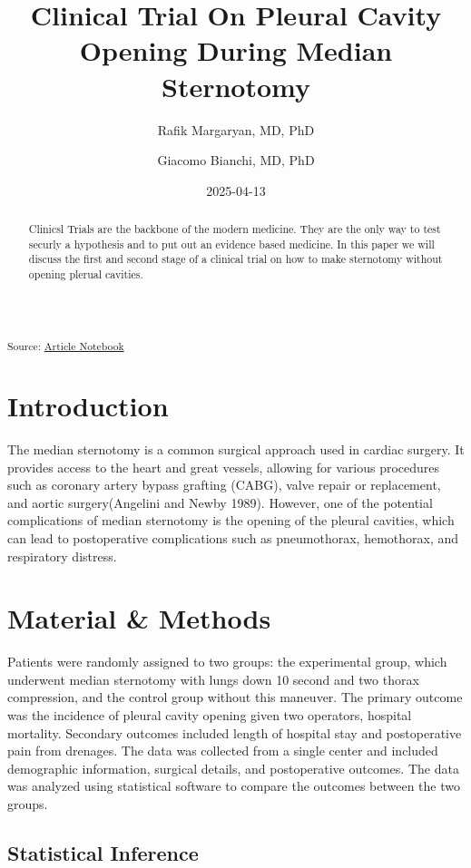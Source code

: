 \documentclass[
  letterpaper,
  DIV=11,
  numbers=noendperiod]{scrartcl}
\title{Clinical Trial On Pleural Cavity Opening During Median
Sternotomy}
\author{Rafik Margaryan, MD, PhD \and Giacomo Bianchi, MD, PhD}
\date{2025-04-13}
\begin{document}
\maketitle
\begin{abstract}
Clinicsl Trials are the backbone of the modern medicine. They are the
only way to test securly a hypothesis and to put out an evidence based
medicine. In this paper we will discuss the first and second stage of a
clinical trial on how to make sternotomy without opening plerual
cavities.
\end{abstract}


\textsubscript{Source:
\href{https://raffdoc.github.io/manuscript-template/index-preview.html}{Article
Notebook}}

\section{Introduction}\label{introduction}

The median sternotomy is a common surgical approach used in cardiac
surgery. It provides access to the heart and great vessels, allowing for
various procedures such as coronary artery bypass grafting (CABG), valve
repair or replacement, and aortic surgery(Angelini and Newby 1989).
However, one of the potential complications of median sternotomy is the
opening of the pleural cavities, which can lead to postoperative
complications such as pneumothorax, hemothorax, and respiratory
distress.

\section{Material \& Methods}\label{sec-data-methods}

Patients were randomly assigned to two groups: the experimental group,
which underwent median sternotomy with lungs down 10 second and two
thorax compression, and the control group without this maneuver. The
primary outcome was the incidence of pleural cavity opening given two
operators, hospital mortality. Secondary outcomes included length of
hospital stay and postoperative pain from drenages. The data was
collected from a single center and included demographic information,
surgical details, and postoperative outcomes. The data was analyzed
using statistical software to compare the outcomes between the two
groups.

\subsection{Statistical Inference}\label{statistical-inference}
\end{document}
